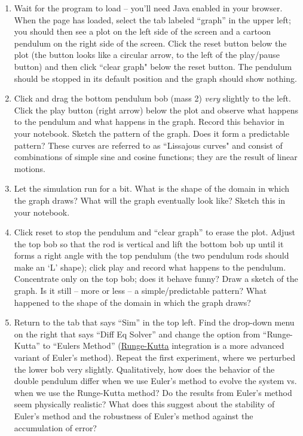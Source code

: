 \documentclass[11pt]{article}
\begin{document}
\begin{enumerate}
\item Wait for the program to load -- you'll need Java enabled in your browser. When the page has loaded, select the tab labeled ``graph'' in the upper left; you should then see a plot on the left side of the screen and a cartoon pendulum on the right side of the screen. Click the reset button below the plot (the button looks like a circular arrow, to the left of the play/pause button) and then click ``clear graph" below the reset button. The pendulum should be stopped in its default position and the graph should show nothing. 

\item Click and drag the bottom pendulum bob (mass 2) \textit{very} slightly to the left. Click the play button (right arrow) below the plot and observe what happens to the pendulum and what happens in the graph. Record this behavior in your notebook. Sketch the pattern of the graph. Does it form a predictable pattern? These curves are referred to as ``Lissajous curves" and consist of combinations of simple sine and cosine functions; they are the result of linear motions.

\item Let the simulation run for a bit. What is the shape of the domain in which the graph draws? What will the graph eventually look like? Sketch this in your notebook.

\item Click reset to stop the pendulum and ``clear graph'' to erase the plot. Adjust the top bob so that the rod is vertical and lift the bottom bob up until it forms a right angle with the top pendulum (the two pendulum rods should make an `L' shape); click play and record what happens to the pendulum. Concentrate only on the top bob; does it behave funny? Draw a sketch of the graph. Is it still -- more or less -- a simple/predictable pattern? What happened to the shape of the domain in which the graph draws?

\item Return to the tab that says ``Sim'' in the top left. Find the drop-down menu on the right that says ``Diff Eq Solver'' and change the option from ``Runge-Kutta'' to ``Eulers Method'' (\href{https://en.wikipedia.org/wiki/Runge\%E2\%80\%93Kutta_methods}{Runge-Kutta} integration is a more advanced variant of Euler's method). Repeat the first experiment, where we perturbed the lower bob very slightly. Qualitatively, how does the behavior of the double pendulum differ when we use Euler's method to evolve the system vs. when we use the Runge-Kutta method? Do the results from Euler's method seem physically realistic? What does this suggest about the stability of Euler's method and the robustness of Euler's method against the accumulation of error?


\end{enumerate}
\end{document}
